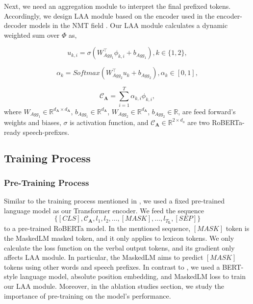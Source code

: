 \documentclass[letterpaper]{article} \usepackage{spconf,amsmath,graphicx}
\begin{document}
Next, we need an aggregation module to interpret the final prefixed tokens. Accordingly, we design LAA module based on the encoder used in the encoder-decoder models in the NMT field \cite{bahdanau2014neural}. Our LAA module calculates a dynamic weighted sum over $\Phi$ as,

\begin{equation}
        u_{k,i} = \sigma(W_{Agg_1}^{\intercal} \phi_{k,i} + b_{Agg_1}), k \in \{1, 2\}, 
\end{equation}



\begin{equation}
        \alpha_k = Softmax(W_{Agg_2}^{\intercal} u_k + b_{Agg_2}),  \alpha_{k} \in [0, 1],
\end{equation}

\begin{equation}
        \mathcal{C}_{\mathbf{A}} = \sum_{i=1}^{T} \alpha_{k,i} \phi_{k,i},
\end{equation}where $W_{Agg_{1}} \in \mathbb{R}^{d_{\mathbf{A}} \times d_{\mathbf{A}}}$, $b_{Agg_{1}} \in \mathbb{R}^{d_{\mathbf{A}}}$, $W_{Agg_{2}} \in \mathbb{R}^{d_{\mathbf{A}}}$, $b_{Agg_{2}} \in \mathbb{R}$, are feed forward's weights and biases, $\sigma$ is activation function, and $\mathcal{C}_{\mathbf{A}} \in \mathbb{R}^{2 \times d_{a}} $ are two RoBERTa-ready speech-prefixes. 

\subsection{Training Process}
\subsubsection{Pre-Training Process}

Similar to the training process mentioned in \cite{tsimpoukelli2021multimodal}, we used a fixed pre-trained language model as our Transformer encoder. We feed the sequence 
\begin{equation*}
    \{[CLS],\mathcal{C}_{\mathbf{A}}, l_1, l_2, \dots,[MASK], \dots, l_{T_{\mathbf{L}}}, [SEP]\}    
\end{equation*}to a pre-trained RoBERTa model. In the mentioned sequence, $[MASK]$ token is the MaskedLM masked token, and it only applies to lexicon tokens. We only calculate the loss function on the verbal output tokens, and its gradient only affects LAA module. In particular, the MaskedLM aims to predict $[MASK]$ tokens using other words and speech prefixes. In contrast to \cite{tsimpoukelli2021multimodal}, we used a BERT-style language model, absolute position embedding, and MaskedLM loss to train our LAA module. Moreover, in the ablation studies section, we study the importance of pre-training on the model's performance.
\end{document}
